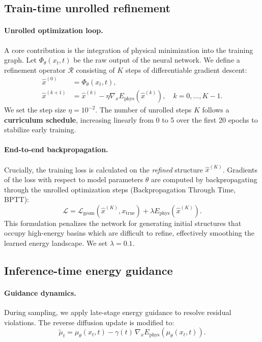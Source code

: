 \documentclass[twocolumn,10pt]{article}
\newcommand{\Ephys}{E_{\text{phys}}}
\begin{document}
\subsection{Train-time unrolled refinement}

\paragraph{Unrolled optimization loop.}
A core contribution is the integration of physical minimization into the training graph. Let $\Phi_\theta(x_t, t)$ be the raw output of the neural network. We define a refinement operator $\mathcal{R}$ consisting of $K$ steps of differentiable gradient descent:
\begin{align}
\hat{x}^{(0)} &= \Phi_\theta(x_t, t), \\
\hat{x}^{(k+1)} &= \hat{x}^{(k)} - \eta \nabla_x E_{\mathrm{phys}}(\hat{x}^{(k)}), \quad k=0,\dots,K-1.
\end{align}
We set the step size $\eta=10^{-2}$. The number of unrolled steps $K$ follows a \textbf{curriculum schedule}, increasing linearly from 0 to 5 over the first 20 epochs to stabilize early training.

\paragraph{End-to-end backpropagation.}
Crucially, the training loss is calculated on the \emph{refined} structure $\hat{x}^{(K)}$. Gradients of the loss with respect to model parameters $\theta$ are computed by backpropagating through the unrolled optimization steps (Backpropagation Through Time, BPTT):
\begin{equation}
\mathcal{L} = \mathcal{L}_{\mathrm{geom}}(\hat{x}^{(K)}, x_{\mathrm{true}}) + \lambda \Ephys(\hat{x}^{(K)}).
\end{equation}
This formulation penalizes the network for generating initial structures that occupy high-energy basins which are difficult to refine, effectively smoothing the learned energy landscape. We set $\lambda=0.1$.

\subsection{Inference-time energy guidance}

\paragraph{Guidance dynamics.}
During sampling, we apply late-stage energy guidance to resolve residual violations. The reverse diffusion update is modified to:
\begin{equation}
\tilde{\mu}_t = \mu_\theta(x_t, t) - \gamma(t)\,\nabla_x E_{\mathrm{phys}}(\mu_\theta(x_t, t)).
\end{equation}
\end{document}
